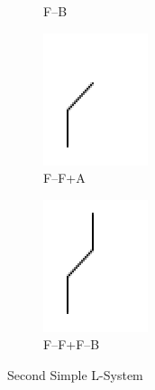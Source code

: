 \documentclass[12pt,twoside]{reedthesis}
\begin{document}
\begin{figure}[h]
\begin{subfigure}{0.25\textwidth}
		\caption{F–B}
		\label {B1}
	\end{subfigure}%
	\begin{subfigure}{0.25\textwidth}
		\centering
		\includegraphics[height=0.8\textwidth]{Images/B2}
		\caption{F–F+A}
		\label {B2}
	\end{subfigure}%
	\begin{subfigure}{0.25\textwidth}
		\centering
		\includegraphics[height=0.8\textwidth]{Images/B3}
		\caption{F–F+F–B}
		\label {B3}
	\end{subfigure}
	\caption{Second Simple L-System}
	\label{Simple2}
	\end{figure}
\end{document}
